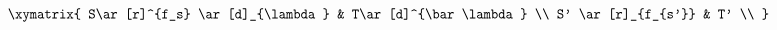 \begin{equation}
\begin{gathered} \xymatrix{
  S\ar[r]^{f_s} \ar[d]_{\lambda}
    & T\ar[d]^{\bar\lambda} \\
  S' \ar[r]_{f_{s'}} & T' \\
} \end{gathered}
\end{equation}
